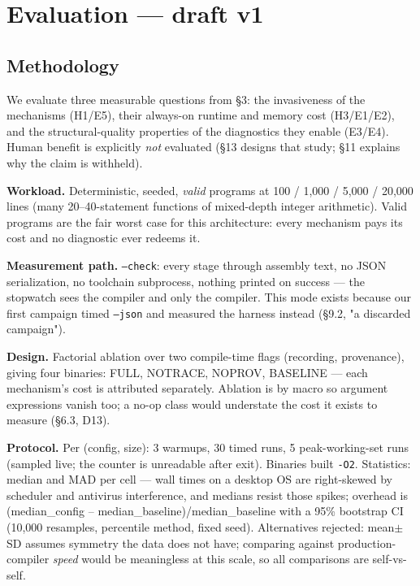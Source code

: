\section{Evaluation --- draft v1}
\label{sec:eval}



\subsection{Methodology}

We evaluate three measurable questions from \S3: the invasiveness of
the mechanisms (H1/E5), their always-on runtime and memory cost
(H3/E1/E2), and the structural-quality properties of the diagnostics
they enable (E3/E4). Human benefit is explicitly \emph{not} evaluated
(\S13 designs that study; \S11 explains why the claim is withheld).

\textbf{Workload.} Deterministic, seeded, \emph{valid} programs at 100 / 1,000
/ 5,000 / 20,000 lines (many 20--40-statement functions of mixed-depth
integer arithmetic). Valid programs are the fair worst case for this
architecture: every mechanism pays its cost and no diagnostic ever
redeems it.

\textbf{Measurement path.} \texttt{--check}: every stage through assembly text,
no JSON serialization, no toolchain subprocess, nothing printed on
success --- the stopwatch sees the compiler and only the compiler. This
mode exists because our first campaign timed \texttt{--json} and measured
the harness instead (\S9.2, "a discarded campaign").

\textbf{Design.} Factorial ablation over two compile-time flags
(recording, provenance), giving four binaries: FULL, NOTRACE,
NOPROV, BASELINE --- each mechanism's cost is attributed separately.
Ablation is by macro so argument expressions vanish too; a no-op
class would understate the cost it exists to measure (\S6.3, D13).

\textbf{Protocol.} Per (config, size): 3 warmups, 30 timed runs, 5
peak-working-set runs (sampled live; the counter is unreadable after
exit). Binaries built \texttt{-O2}. Statistics: median and MAD per cell ---
wall times on a desktop OS are right-skewed by scheduler and
antivirus interference, and medians resist those spikes; overhead is
(median\_config -- median\_baseline)/median\_baseline with a 95\%
bootstrap CI (10,000 resamples, percentile method, fixed seed).
Alternatives rejected: mean$\pm$SD assumes symmetry the data does not
have; comparing against production-compiler \emph{speed} would be
meaningless at this scale, so all comparisons are self-vs-self.

